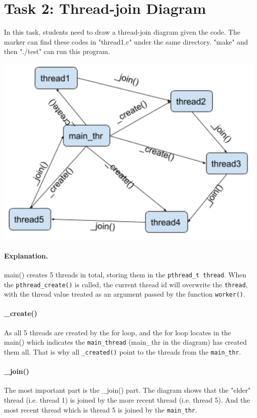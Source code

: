 \documentclass{article}
\begin{document}
\section{Task 2: Thread-join Diagram}
In this task, students need to draw a thread-join diagram given the code. The marker can find these codes in "thread1.c" under the same directory. "make" and then "./test" can run this program. \\
\begin{center}
\includegraphics[scale=0.5]{diagram.png}
\end{center}
\paragraph{Explanation.}
main() creates 5 threads in total, storing them in the \texttt{pthread\_t thread}. When the \texttt{pthread\_create()} is called, the current thread id will overwrite the \texttt{thread}, with the thread value treated as an argument passed by the function \texttt{worker()}. 
\paragraph{\_create()}
As all 5 threads are created by the for loop, and the for loop locates in the main() which indicates the \texttt{main\_thread} (main\_thr in the diagram) has created them all. That is why all \texttt{\_created()} point to the threads from the \texttt{main\_thr}.
\paragraph{\_join()}
The most important part is the \_join() part. The diagram shows that the "elder" thread (i.e. thread 1) is joined by the more recent thread (i.e. thread 5). And the most recent thread which is thread 5 is joined by the \texttt{main\_thr}.
\end{document}
